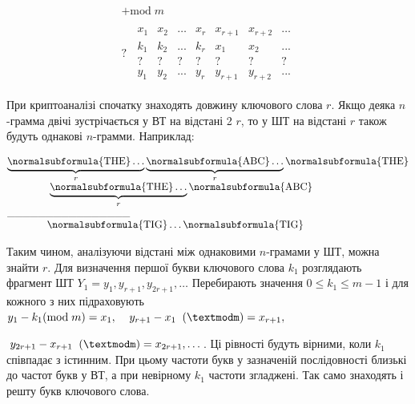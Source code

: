 \bigskip

\begin{equation*}
{\begin{matrix}+\text{mod}\;m\\\\?\;\;\begin{matrix}x_{1}&x_{2}&\dots&x_{r}&x_{r+1}&x_{r+2}&\dots\\k_{1}&k_{2}&\text{.}\text{.}\text{.}&k_{r}&x_{1}&x_{2}&\text{.}\text{.}\text{.}\\?&?&?&?&?&?&?\\y_{1}&y_{2}&\text{.}\text{.}\text{.}&y_{r}&y_{r+1}&y_{r+2}&\text{.}\text{.}\text{.}\end{matrix}\end{matrix}}
\end{equation*}

\bigskip

При криптоаналізі спочатку знаходять довжину ключового слова  $r$. Якщо деяка 
$n$-грамма двічі зустрічається у ВТ на відстані 2 $r$, то у ШТ на
відстані  $r$ також будуть однакові  $n${}-грамми. Наприклад:


\bigskip

\begin{equation*}
\begin{matrix}{\underbrace{\normalsubformula{\text{THE}}\dots}_{r}\underbrace{\normalsubformula{\text{ABC}}\dots}_{r}\normalsubformula{\text{THE}}}\hfill\null
\\\;\;\;\;\;\;\;\;\;\;\;\;\;\;\;\underbrace{\normalsubformula{\text{THE}}\dots}_{r}\normalsubformula{\text{ABC}}\hfill\null
\\\text{\_\_\_\_\_\_\_\_\_\_\_\_\_\_\_\_}\hfill\null
\\\;\;\;\;\;\;\;\;\;\;\;\;\;\;\normalsubformula{\text{TIG}}\dots\normalsubformula{\text{TIG}}\hfill\null
\end{matrix}\hfill 
\end{equation*}

\bigskip

Таким чином, аналізуючи відстані між однаковими  $n${}-грамами у ШТ, можна
знайти  $r$. Для визначення першої букви ключового слова  $k_1$
розглядають фрагмент ШТ 
$Y_{1}=y_1,y_{r+1},y_{2r+1},\dots$ Перебирають
значення  $0\le k_1\le m-1$ і для кожного з них підраховують 
$y_{1}-k_{1}(\text{mod}\;m)=x_{1},\;\;\;\;y_{r+1}-x_{1}\;\;(\textmodm)=x_{r+1},\;\;\;\;\;$


$\;y_{2r+1}-x_{r+1}\;\;(\textmodm)=x_{2r+1},\dots$.
Ці рівності будуть вірними, коли  $k_1$ співпадає з істинним. При цьому
частоти букв у зазначеній послідовності близькі до частот букв у ВТ, а при
невірному  $k_1$ частоти згладжені. Так само знаходять і решту букв
ключового слова.

